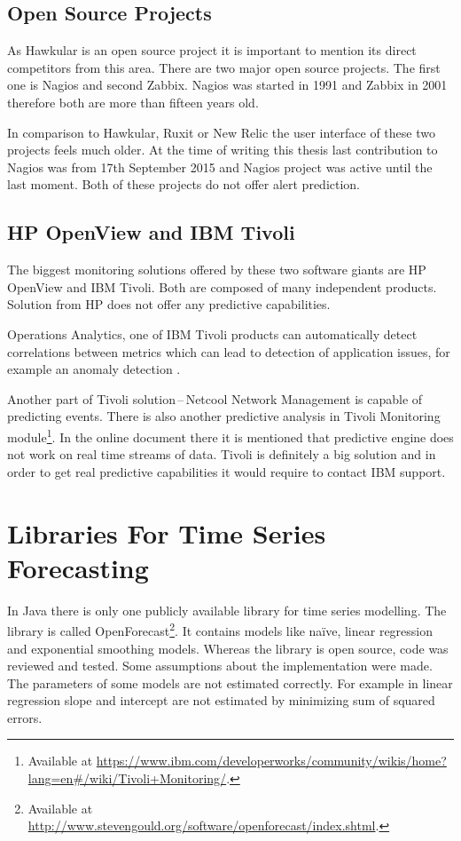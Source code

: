         \subsection{Open Source Projects}
        As Hawkular is an open source project it is important to mention its direct competitors from this area.
        There are two major open source projects. The first one is Nagios and second Zabbix. Nagios was started in
        1991 and Zabbix in 2001 therefore both are more than fifteen years old.

        In comparison to Hawkular, Ruxit or New Relic the user interface of these two projects feels much older.
        At the time of writing this thesis last contribution to Nagios was from 17th September 2015 and Nagios
        project was active until the last moment. Both of these projects do not offer alert prediction.

        \subsection{HP OpenView and IBM Tivoli}
        The biggest monitoring solutions offered by these two software giants are HP OpenView and IBM Tivoli. Both are
        composed of many independent products. Solution from HP does not offer any predictive capabilities.

        Operations Analytics, one of IBM Tivoli products can automatically detect correlations between
        metrics which can lead to detection of application issues, for example an anomaly detection
        \cite{tivoli-predictive-insights}.

        Another part of Tivoli solution\,--\,Netcool Network Management is capable
        of predicting events. There is also another predictive analysis in Tivoli Monitoring
        module\footnote{Available at
        \url{https://www.ibm.com/developerworks/community/wikis/home?lang=en\#/wiki/Tivoli+Monitoring/}.}.
        In the online document there it is mentioned that predictive engine does not work on real time streams of data.
        Tivoli is definitely a big solution and in order to get real predictive capabilities it would require to
        contact IBM support.

    \section{Libraries For Time Series Forecasting} \label{sec:libraries-for-ts}
    In Java there is only one publicly available library for time series modelling. The library is called
    OpenForecast\footnote{Available at \url{http://www.stevengould.org/software/openforecast/index.shtml}.}. It contains
    models like na\"{i}ve, linear regression and exponential smoothing models. Whereas the library is open source, code
    was reviewed and tested. Some assumptions about the implementation were made. The parameters of some models are
    not estimated correctly. For example in linear regression slope and intercept are not estimated by minimizing
    sum of squared errors.


